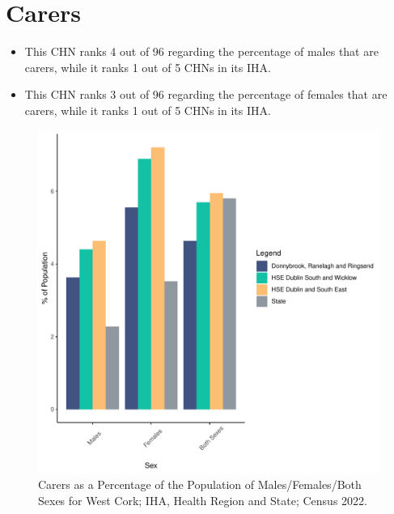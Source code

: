 \documentclass{article}
\begin{document}
\section{Carers}\label{sect:Carers}
\begin{itemize}
\item This CHN ranks  4 out of 96 regarding the percentage of males that are carers, while it ranks   1 out of 5 CHNs in its IHA.
\item This CHN ranks  3 out of 96 regarding the percentage of females that are carers, while it ranks   1 out of 5 CHNs in its IHA.
\end{itemize}
\begin{figure}[H]
	\centering
	\includegraphics[width = 150mm]{../figures/CareED.pdf}
	\caption{Carers as a Percentage of the Population of Males/Females/Both Sexes for West Cork; IHA, Health Region and State; Census 2022.}
	\label{fig:2ae19629-1a6a-13a3-e055-000000000001}
	\end{figure}
\end{document}
